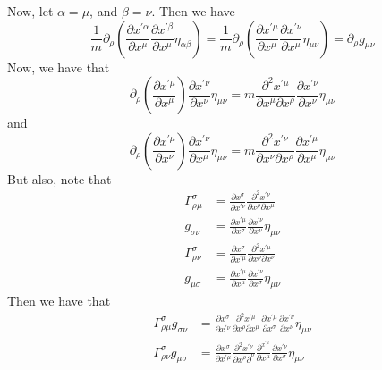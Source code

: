 \documentclass[12pt]{article}
\theoremstyle{definition}
\theoremstyle{remark}
\begin{document}
Now, let $\alpha = \mu$, and $\beta = \nu$.  Then we have 
\[
\frac{1}{m} \partial_{\rho} 
\left( \frac{ \partial x^{ \prime \alpha } }{ \partial x^{ \mu } } 
\frac{ \partial x^{ \prime \beta } }{ \partial x^{ \mu } } 
\eta_{ \alpha \beta } \right)
=
\frac{ 1}{m} \partial_{\rho} 
\left( \frac{ \partial x^{ \prime \mu } }{ \partial x^{ \mu } } 
\frac{ \partial x^{ \prime \nu } }{ \partial x^{ \mu } } 
\eta_{ \mu \nu } \right)
=
\partial_{ \rho } g_{ \mu \nu }
\]
Now, we have that 
\[
\partial_{ \rho } \left( \frac{ \partial x^{ \prime \mu } }{ \partial x^{ \mu }} \right)
\frac{ \partial x^{ \prime \nu } }{ \partial x^{ \nu } } \eta_{ \mu \nu } 
=
m \frac{ \partial^2 x^{ \prime \mu } }{ \partial x^{ \mu } \partial x^{ \rho } } \frac{ \partial x^{ \prime \nu } }{ \partial x^{ \nu } } \eta_{ \mu \nu } 
\]
and 
\[
\partial_{ \rho } \left( \frac{ \partial x^{ \prime \mu } }{ \partial x^{ \nu } } \right) 
\frac{ \partial x^{ \prime \nu } }{ \partial x^{ \mu } } \eta_{ \mu \nu } 
= 
 m \frac{ \partial^2 x^{ \prime \nu } }{ \partial x^{ \nu } \partial x^{ \rho } } 
 \frac{ \partial x^{ \prime \mu } }{ \partial x^{ \mu } } \eta_{ \mu \nu } 
\]
But also, note that 
\begin{align*}
\Gamma^{ \sigma }_{ \rho \mu } &= \frac{ \partial x^{ \sigma } }{ \partial x^{ \prime \nu } } \frac{ \partial^{2} x^{ \prime \nu } }{ \partial x^{ \rho } \partial x^{ \mu } } \\
g_{ \sigma \nu } &= \frac{ \partial x^{ \prime \mu } }{ \partial x^{ \sigma }} 
\frac{ \partial x^{ \prime \nu } }{ \partial x^{ \nu } } \eta_{ \mu \nu } \\
\Gamma^{ \sigma }_{ \rho \nu } &= \frac{ \partial x^{ \sigma } }{ \partial x^{ \prime \mu } } \frac{ \partial^2 x^{ \prime \mu } }{ \partial x^{ \rho } \partial x^{ \nu } } \\
g_{ \mu \sigma } &= \frac{ \partial x^{ \prime \mu } }{ \partial x^{ \mu } } \frac{ \partial x^{ \prime \nu } }{ \partial x^{ \sigma } } \eta_{ \mu \nu }
\end{align*}
Then we have that 
\begin{align*}
\Gamma_{\rho \mu }^{ \sigma } g_{ \sigma \nu } 
&= 
\frac{ \partial x^{ \sigma } }{ \partial x^{ \prime \nu } } 
\frac{ \partial^2 x^{ \prime \mu } }{ \partial x^{ \rho } \partial x^{ \mu } } 
\frac{ \partial x^{ \prime \mu }}{ \partial x^{ \sigma } } 
\frac{ \partial x^{ \prime \nu } }{ \partial x^{ \nu } } \eta_{ \mu \nu } \\
\Gamma_{ \rho \nu }^{ \sigma } g_{ \mu \sigma } 
&= 
\frac{ \partial x^{ \sigma } }{ \partial x^{ \prime \mu } } 
\frac{ \partial^2 x^{ \prime \nu } }{ \partial x^{ \rho }  \partial ^{ \nu } } 
\frac{ \partial^{ x^{ \prime \mu } } }{ \partial x^{ \mu } } 
\frac{ \partial x^{ \prime \nu } }{ \partial x^{\sigma } } \eta_{ \mu \nu } 
\end{align*}
\end{document}
